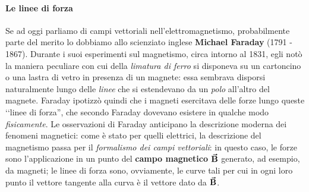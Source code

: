 \paragraph{Le linee di forza}
Se ad oggi parliamo di campi vettoriali nell'elettromagnetismo, probabilmente parte del merito lo dobbiamo allo scienziato inglese \textbf{Michael Faraday} (1791 - 1867). Durante i suoi esperimenti sul magnetismo, circa intorno al 1831, egli notò la maniera peculiare con cui della \textit{limatura di ferro} si disponeva su un cartoncino o una lastra di vetro in presenza di un magnete: essa sembrava disporsi naturalmente lungo delle \textit{linee} che si estendevano da un \textit{polo} all'altro del magnete. Faraday ipotizzò quindi che i magneti esercitava delle forze lungo queste ‘‘linee di forza'', che secondo Faraday dovevano esistere in qualche modo \textit{fisicamente}.
Le osservazioni di Faraday anticipano la descrizione moderna dei fenomeni magnetici: come è stato per quelli elettrici, la descrizione del magnetismo passa per il \textit{formalismo dei campi vettoriali}: in questo caso, le forze sono l'applicazione in un punto del \textbf{campo magnetico} $\vb*{\va{B}}$ generato, ad esempio, da magneti; le linee di forza sono, ovviamente, le curve tali per cui in ogni loro punto il vettore tangente alla curva è il vettore dato da $\vb*{\va{B}}$.


